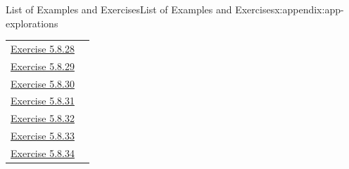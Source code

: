 \documentclass[oneside,10pt,]{book}
\numberwithin{equation}{section}
\begin{document}
\begin{appendixptx}{List of Examples and Exercises}{}{List of Examples and Exercises}{}{}{x:appendix:app-explorations}
\begin{longtable}[l]{ll}
\hyperlink{g:exercise:id495296}{Exercise 5.8.28}& \\
\hyperlink{g:exercise:id495319}{Exercise 5.8.29}& \\
\hyperlink{g:exercise:id495313}{Exercise 5.8.30}& \\
\hyperlink{g:exercise:id495348}{Exercise 5.8.31}& \\
\hyperlink{g:exercise:id495358}{Exercise 5.8.32}& \\
\hyperlink{g:exercise:id495351}{Exercise 5.8.33}& \\
\hyperlink{g:exercise:id495396}{Exercise 5.8.34}& \\
\end{longtable}
\end{appendixptx}
%
\backmatter
%
%
%
\typeout{************************************************}
\typeout{************************************************}
%
\end{document}
